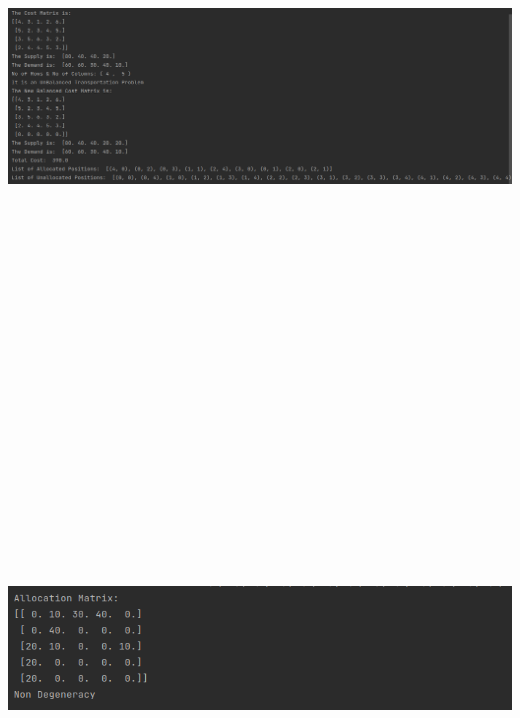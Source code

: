 \documentclass[12pt, letterpaper, twoside]{book}
\begin{document}
\includegraphics[height=600pt,width=550pt]{Output2}

\includegraphics[height=200pt,width=550pt]{Output3}
\end{document}
